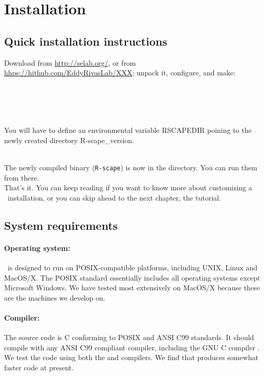 \section{Installation}
\label{section:installation}
\setcounter{footnote}{0}

\subsection{Quick installation instructions}

Download  from \url{http://selab.org/}, or
from
\url{hhps://hithub.com/EddyRivasLab/XXX};
unpack it, configure, and make:

\\
\\
\\ 
\\

You will have to define an environmental variable RSCAPEDIR
poining to the newly created directory R-scape\_version.

\\

The newly compiled binary (\texttt{R-scape}) is now in the 
directory. You can run them from there.\\

That's it.  You can keep reading if you want to know more about
customizing a \rscape\ installation, or you can skip ahead to the next
chapter, the tutorial.

\subsection{System requirements}

\paragraph{Operating system:} \rscape\ is designed to run on
POSIX-compatible platforms, including UNIX, Linux and MacOS/X. The
POSIX standard essentially includes all operating systems except
Microsoft Windows. We have tested most extensively on MacOS/X because
these are the machines we develop on.

\paragraph{Compiler:} The source code is C conforming to POSIX and ANSI
C99 standards. It should compile with any ANSI C99 compliant compiler,
including the GNU C compiler . We test the code using both
the  and  compilers. We find that 
produces somewhat faster code at present.

